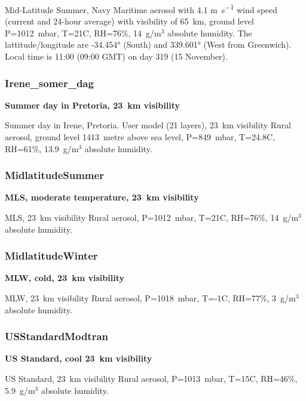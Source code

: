 \documentclass{workpackage}
\begin{document}
Mid-Latitude Summer, Navy Maritime aerosol with 4.1 \si{\metre\per\second} wind speed (current and 24-hour average) with visibility of 65~\si{\kilo\metre},
ground level P=1012~mbar, T=21C, RH=76\%, 14~g/m$^3$ absolute humidity.
The lattitude/longitude are -34.454\si{\degree} (South) and 339.601\si{\degree} (West from Greenwich).
Local time is 11:00 (09:00 GMT) on day 319 (15 November).

\subsubsection{Irene\_somer\_dag}
\label{sec:Irenesomerdag}

\textbf{Summer day in Pretoria, 23~\si{\kilo\metre} visibility}

Summer day in Irene, Pretoria.
User model (21 layers), 23~\si{\kilo\metre} visibility Rural aerosol,  ground level 1413~\si{metre} above sea level,  P=849~mbar, T=24.8C, RH=61\%, 13.9~g/m$^3$  absolute humidity.

\subsubsection{MidlatitudeSummer}
\label{sec:MidlatitudeSummer}

\textbf{MLS, moderate temperature, 23~\si{\kilo\metre} visibility}

MLS, 23~\si{\kilo\metre} visibility Rural aerosol,  P=1012~mbar, T=21C, RH=76\%, 14~g/m$^3$ absolute humidity.

\subsubsection{MidlatitudeWinter}
\label{sec:MidlatitudeWinter}

\textbf{MLW, cold,  23~\si{\kilo\metre} visibility}

MLW, 23~\si{\kilo\metre} visibility Rural aerosol,
  P=1018~mbar, T=-1C, RH=77\%, 3~g/m$^3$ absolute humidity.

\subsubsection{USStandardModtran}
\label{sec:USStandardModtran}

\textbf{US Standard, cool 23~\si{\kilo\metre} visibility}

US Standard, 23~\si{\kilo\metre} visibility Rural aerosol,
P=1013~mbar, T=15C, RH=46\%, 5.9~g/m$^3$ absolute humidity. 
\end{document}
